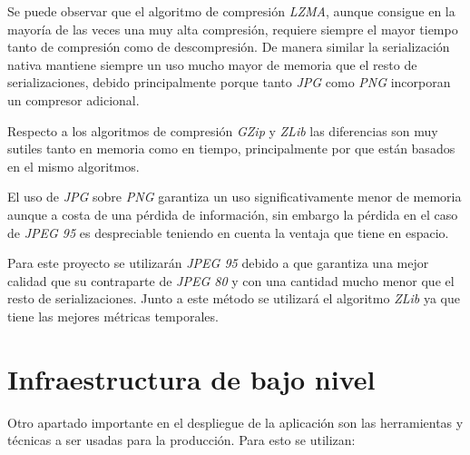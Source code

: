 Se puede observar que el algoritmo de compresión \textit{LZMA}, aunque consigue en la mayoría de las veces una muy alta compresión, requiere siempre el mayor tiempo tanto de compresión como de descompresión. De manera similar la serialización nativa mantiene siempre un uso mucho mayor de memoria que el resto de serializaciones, debido principalmente porque tanto \textit{JPG} como \textit{PNG} incorporan un compresor adicional.

Respecto a los algoritmos de compresión \textit{GZip} y \textit{ZLib} las diferencias son muy sutiles tanto en memoria como en tiempo, principalmente por que están basados en el mismo algoritmos.

El uso de \textit{JPG} sobre \textit{PNG} garantiza un uso significativamente menor de memoria aunque a costa de una pérdida de información, sin embargo la pérdida en el caso de \textit{JPEG 95} es despreciable teniendo en cuenta la ventaja que tiene en espacio.

Para este proyecto se utilizarán \textit{JPEG 95} debido a que garantiza una mejor calidad que su contraparte de \textit{JPEG 80} y con una cantidad mucho menor que el resto de serializaciones. Junto a este método se utilizará el algoritmo \textit{ZLib} ya que tiene las mejores métricas temporales.


\section{Infraestructura de bajo nivel}\label{sec:bajonivel}

Otro apartado importante en el despliegue de la aplicación son las herramientas y técnicas a ser usadas para la producción. Para esto se utilizan:

